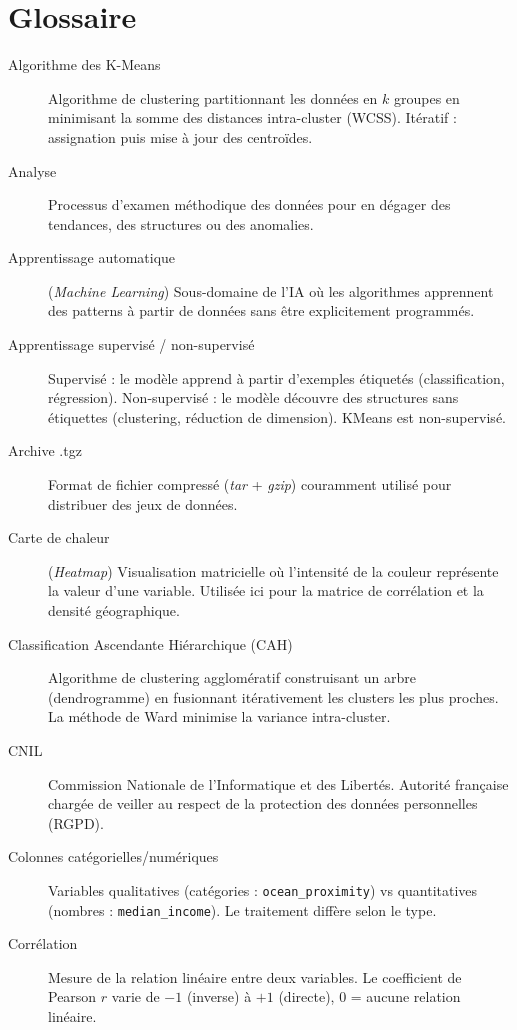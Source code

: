 \documentclass[11pt,a4paper]{article}
\begin{document}
\clearpage
\section*{Glossaire}

\begin{description}
    \item[Algorithme des K-Means] Algorithme de clustering partitionnant les données en $k$ groupes en minimisant la somme des distances intra-cluster (WCSS). Itératif : assignation puis mise à jour des centroïdes.
    \item[Analyse] Processus d'examen méthodique des données pour en dégager des tendances, des structures ou des anomalies.
    \item[Apprentissage automatique] (\textit{Machine Learning}) Sous-domaine de l'IA où les algorithmes apprennent des patterns à partir de données sans être explicitement programmés.
    \item[Apprentissage supervisé / non-supervisé] Supervisé : le modèle apprend à partir d'exemples étiquetés (classification, régression). Non-supervisé : le modèle découvre des structures sans étiquettes (clustering, réduction de dimension). KMeans est non-supervisé.
    \item[Archive .tgz] Format de fichier compressé (\textit{tar} + \textit{gzip}) couramment utilisé pour distribuer des jeux de données.
    \item[Carte de chaleur] (\textit{Heatmap}) Visualisation matricielle où l'intensité de la couleur représente la valeur d'une variable. Utilisée ici pour la matrice de corrélation et la densité géographique.
    \item[Classification Ascendante Hiérarchique (CAH)] Algorithme de clustering agglomératif construisant un arbre (dendrogramme) en fusionnant itérativement les clusters les plus proches. La méthode de Ward minimise la variance intra-cluster.
    \item[CNIL] Commission Nationale de l'Informatique et des Libertés. Autorité française chargée de veiller au respect de la protection des données personnelles (RGPD).
    \item[Colonnes catégorielles/numériques] Variables qualitatives (catégories : \texttt{ocean\_proximity}) vs quantitatives (nombres : \texttt{median\_income}). Le traitement diffère selon le type.
    \item[Corrélation] Mesure de la relation linéaire entre deux variables. Le coefficient de Pearson $r$ varie de $-1$ (inverse) à $+1$ (directe), 0 = aucune relation linéaire.

\end{description}
\end{document}
